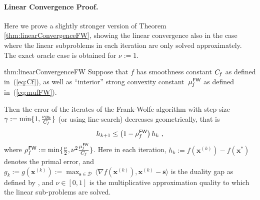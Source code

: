 \documentclass{article} %
\newcommand{\domain}{\mathcal{D}}
\newcommand{\stepsize}{\gamma}
\newcommand{\FW}{{\hspace{0.05em}\textsf{FW}}}
\newcommand{\Cf}{C_{\hspace{-0.08em}f}}
\newcommand{\strongConvFW}{\mu_{\hspace{-0.08em}f}^\FW}
\newcommand{\x}{\bm{x}}
\newcommand{\s}{\bm{s}}
\newcommand{\mapprox}{\nu} %
\newcommand{\0}{\mathbf{0}} %
\begin{document}
\paragraph{Linear Convergence Proof.}
Here we prove a slightly stronger version of Theorem \ref{thm:linearConvergenceFW}, showing the linear convergence also in the case where the linear subproblems in each iteration are only solved approximately.
The exact oracle case is obtained for $\mapprox :=1$.

\begin{reptheorem}{thm:linearConvergenceFW}
Suppose that $f$ has smoothness constant $\Cf$ as defined in~(\ref{eq:Cf}),
as well as ``interior'' strong convexity constant~$\strongConvFW$ as defined in~(\ref{eq:mufFW}).
%

Then the error of the iterates of the Frank-Wolfe algorithm with step-size $\stepsize := \min\{1, \frac{\mapprox g_k}{\Cf} \}$
(or using line-search) decreases geometrically, that is\vspace{-1mm}
\[
h_{k+1} \leq \left(1-\rho_f^\FW\right) h_k \ , \vspace{-2mm}
\]
where $\rho_f^\FW := \min \{\frac\mapprox2, \mapprox^2 \frac{\strongConvFW}{\Cf} \}$. Here in each iteration, $h_k := f(\x^{(k)}) - f(\x^*)$ denotes the primal error, and $g_k :=  g(\x^{(k)}) := \displaystyle\max_{\s \in \domain} \,\big\langle \nabla f(\x^{(k)}), \x^{(k)} - \s  \big\rangle$ is the duality gap as defined by \cite{Jaggi:2013wg}, 
and $\mapprox\in[0,1]$ is the multiplicative approximation quality to which the linear sub-problems are solved.
\end{reptheorem}
%
\end{document}

